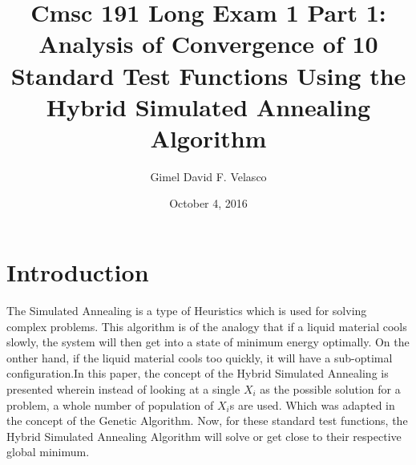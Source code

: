 \documentclass{article}
\begin{document}
\title{Cmsc 191 Long Exam 1 Part 1: Analysis of Convergence of 10 Standard Test Functions Using the Hybrid Simulated Annealing Algorithm}

\author{Gimel David F. Velasco}

\date{October 4, 2016}

\maketitle


\section{Introduction}
The Simulated Annealing is a type of Heuristics which is used for solving complex problems. This algorithm is of the analogy that if a liquid material cools slowly, the system will then get into a state of minimum energy optimally. On the onther hand, if the liquid material cools too quickly, it will have a sub-optimal configuration.In this paper, the concept of the Hybrid Simulated Annealing is presented wherein instead of looking at a single $X_i$ as the possible solution for a problem, a whole number of population of $X_i$s are used. Which was adapted in the concept of the Genetic Algorithm. Now, for these standard test functions, the Hybrid Simulated Annealing Algorithm will solve or get close to their respective global minimum.
\end{document}
